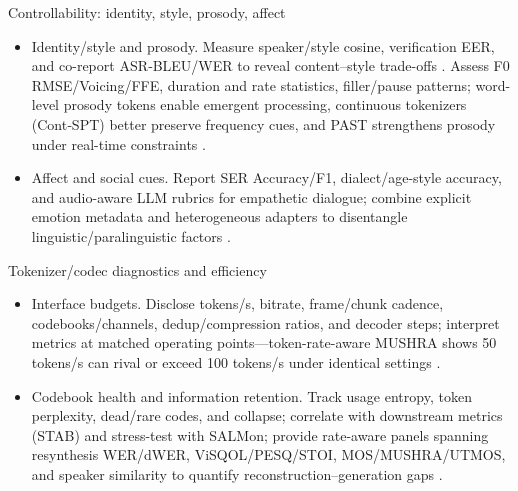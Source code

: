 \documentclass{article}
\begin{document}
Controllability: identity, style, prosody, affect
\begin{itemize}
  \item Identity/style and prosody. Measure speaker/style cosine, verification EER, and co-report ASR‑BLEU/WER to reveal content–style trade-offs \cite{wang2024whydospeechlanguagemodelsfailgeneratesem,entry2025towardjointlanguagemodelingspeechunitste,jo2025lmsptalignedsemanticdistillationspeechto,entry2025indicsuperbspeechprocessinguniversalperf}. Assess F0 RMSE/Voicing/FFE, duration and rate statistics, filler/pause patterns; word-level prosody tokens enable emergent processing, continuous tokenizers (Cont‑SPT) better preserve frequency cues, and PAST strengthens prosody under real-time constraints \cite{qian2025prosodylmuncoveringemergingprosodyproces,li2025continuousspeechtokenizertext,har-tuv2025pastphoneticacousticspeechtokenizer,onda2025benchmarkingprosodyencodingdiscretespeec}.
  \item Affect and social cues. Report SER Accuracy/F1, dialect/age-style accuracy, and audio-aware LLM rubrics for empathetic dialogue; combine explicit emotion metadata and heterogeneous adapters to disentangle linguistic/paralinguistic factors \cite{wang2024blspemotowardsempatheticlargespeechlangu,wang2025dualinformationspeechlanguagemodelsemoti,wang2025incorporatingcontextualparalinguisticund}.
\end{itemize}

Tokenizer/codec diagnostics and efficiency
\begin{itemize}
  \item Interface budgets. Disclose tokens/s, bitrate, frame/chunk cadence, codebooks/channels, dedup/compression ratios, and decoder steps; interpret metrics at matched operating points—token-rate-aware MUSHRA shows 50 tokens/s can rival or exceed 100 tokens/s under identical settings \cite{yang2025diffsoundstreamefficientspeechtokenizati}.
  \item Codebook health and information retention. Track usage entropy, token perplexity, dead/rare codes, and collapse; correlate with downstream metrics (STAB) and stress-test with SALMon; provide rate-aware panels spanning resynthesis WER/dWER, ViSQOL/PESQ/STOI, MOS/MUSHRA/UTMOS, and speaker similarity to quantify reconstruction–generation gaps \cite{vashishth2024stabspeechtokenizerassessmentbenchmark,maimon2025salmonsuiteacousticlanguagemodelevaluati,har-tuv2025pastphoneticacousticspeechtokenizer,wu2023speechgenunlockinggenerativepowerspeechl,wang2023slmbridgethingapbetweenspeechtextfoundat}.
\end{itemize}
\end{document}
